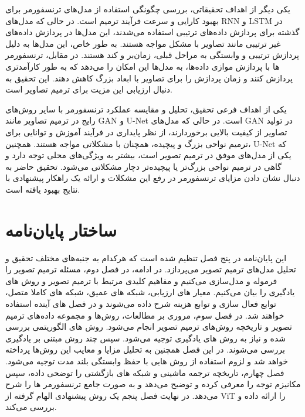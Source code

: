 یکی دیگر از اهداف تحقیقاتی، بررسی چگونگی استفاده از مدل‌های ترنسفورمر برای بهبود کارایی و سرعت فرآیند ترمیم است. در حالی که مدل‌های RNN و LSTM در گذشته برای پردازش داده‌های ترتیبی استفاده می‌شدند، این مدل‌ها در پردازش داده‌های غیر ترتیبی مانند تصاویر با مشکل مواجه هستند. به طور خاص، این مدل‌ها به دلیل پردازش ترتیبی و وابستگی به مراحل قبلی، زمان‌بر و کند هستند. در مقابل، ترنسفورمر ها با پردازش موازی داده‌ها، به مدل‌ها این امکان را می‌دهد که به طور کارآمدتری پردازش کنند و زمان پردازش را برای تصاویر با ابعاد بزرگ کاهش دهند. این تحقیق به دنبال ارزیابی این مزیت برای ترمیم تصاویر است.

یکی از اهداف فرعی تحقیق، تحلیل و مقایسه عملکرد ترنسفورمر با سایر روش‌های رایج در ترمیم تصاویر مانند GAN و U-Net است. در حالی که مدل‌های GAN در تولید تصاویر از کیفیت بالایی برخوردارند، از نظر پایداری در فرآیند آموزش و توانایی برای ترمیم نواحی بزرگ و پیچیده، همچنان با مشکلاتی مواجه هستند. همچنین، U-Net که یکی از مدل‌های موفق در ترمیم تصویر است، بیشتر به ویژگی‌های محلی توجه دارد و گاهی در ترمیم نواحی بزرگ‌تر یا پیچیده‌تر دچار مشکلاتی می‌شود. تحقیق حاضر به دنبال نشان دادن مزایای ترنسفورمر در رفع این مشکلات و ارائه یک راهکار پیشنهادی با نتایج بهبود یافته است.



\section{ساختار پایان‌نامه}

این پایان‌نامه در پنج فصل تنظیم شده است که هرکدام به جنبه‌های مختلف تحقیق و تحلیل مدل‌های ترمیم تصویر می‌پردازد. در ادامه، در فصل دوم، مسئله ترمیم تصویر را فرموله و مدل‌سازی می‌کنیم و مفاهیم کلیدی مرتبط با ترمیم تصویر و  روش های یادگیری را بیان می‌کنیم. معیار های ارزیابی، شبکه های عمیق، شبکه های کاملا متصل، توابع فعال سازی و توابع هزینه شرح داده می‌شوند و در فصل های آینده استفاده خواهند شد. در فصل سوم، مروری بر مطالعات، روش‌ها و مجموعه داده‌های%
ترمیم تصویر و تاریخچه روش‌های ترمیم تصویر انجام می‌شود. روش های الگوریتمی بررسی شده و نیاز به روش های یادگیری توجیه می‌شود. سپس چند روش مبتنی بر یادگیری بررسی می‌شوند. در این فصل همچنین به تحلیل مزایا و معایب این روش‌ها پرداخته خواهد شد و لزوم استفاده از روش هایی  با حفظ وابستگی بلند مدت توجیه می‌شود. فصل چهارم، تاریخچه ترجمه ماشینی و شبکه های بازگشتی را توضحی داده، سپس مکانیزم توجه را معرفی کرده و توضیح می‌دهد و به صورت جامع ترنسفورمر ها را شرح می‌دهد. در نهایت فصل پنجم یک روش پیشنهادی الهام گرفته از ViT را ارائه داده و بررسی می‌کند.
